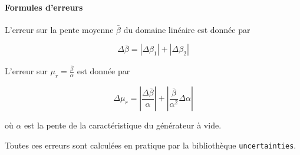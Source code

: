\paragraph*{Formules d'erreurs}
L'erreur sur la pente moyenne \(\bar{\beta}\) du domaine linéaire est donnée par

\begin{equation}
    \Delta \bar{\beta} = \left|\Delta \beta_1\right| + \left|\Delta \beta_2\right|
\end{equation}

L'erreur sur \(\mu_r = \frac{\bar{\beta}}{\alpha}\) est donnée par

\begin{equation}
    \Delta\mu_r = \left|\frac{\Delta\bar{\beta}}{\alpha}\right| + \left|\frac{\bar{\beta}}{\alpha^2} \Delta\alpha\right|
\end{equation}

où \(\alpha\) est la pente de la caractéristique du générateur à vide.

Toutes ces erreurs sont calculées en pratique par la bibliothèque \texttt{uncertainties}.
